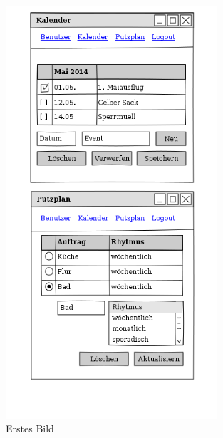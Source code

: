 \begin{figure}[H] 
  \centering
     \includegraphics[width=0.7\textwidth]{anhang/mockups/webpage_1.png}
  \caption{Erstes Bild}
  \label{fig:Bild1}
\end{figure}

